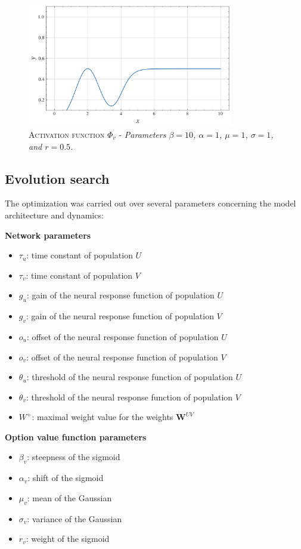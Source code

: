 \begin{figure}[ht]
    \centering
    \includegraphics[width=0.8\textwidth]{figures/gaussian_sigmoid.png}
    \caption{\textsc{Activation function $\Phi_{v}$} - \textit{Parameters $\beta=10$, $\alpha=1$, $\mu=1$, $\sigma=1$, and $r=0.5$.}}
    \label{fig:gau_sigm}
\end{figure}


\subsection{Evolution search}
The optimization was carried out over several parameters concerning the model architecture and dynamics:

\noindent \textbf{Network parameters}
\begin{itemize}
    \item $\tau_{u}$: time constant of population $U$
    \item $\tau_{v}$: time constant of population $V$
    \item $g_{u}$: gain of the neural response function of population $U$
    \item $g_{v}$: gain of the neural response function of population $V$
    \item $o_{u}$: offset of the neural response function of population $U$
    \item $o_{v}$: offset of the neural response function of population $V$
    \item $\theta_{u}$: threshold of the neural response function of population $U$
    \item $\theta_{v}$: threshold of the neural response function of population $V$
    \item $W^{+}$: maximal weight value for the weights $\textbf{W}^{UV}$
\end{itemize}

\noindent \textbf{Option value function parameters}
\begin{itemize}
    \item $\beta_{v}$: steepness of the sigmoid
    \item $\alpha_{v}$: shift of the sigmoid
    \item $\mu_{v}$: mean of the Gaussian
    \item $\sigma_{v}$: variance of the Gaussian
    \item $r_{v}$: weight of the sigmoid
\end{itemize}

